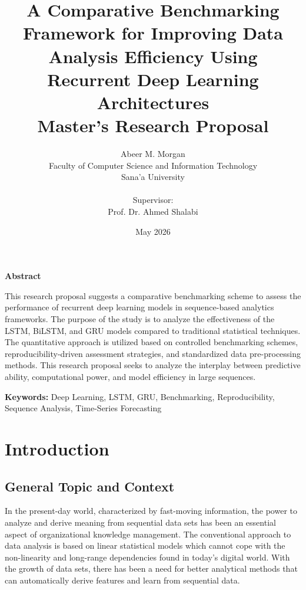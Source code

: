 \documentclass[12pt]{report}
\title{
\vspace{2cm}
\Huge\bfseries\color{primary}
A Comparative Benchmarking Framework for Improving Data Analysis Efficiency Using Recurrent Deep Learning Architectures
\\[1cm]
\Large\color{secondary}
Master's Research Proposal
}
\author{
\Large Abeer M. Morgan
\\[0.3cm]
\large Faculty of Computer Science and Information Technology
\\
Sana’a University
 \\
 \\
Supervisor:\\
Prof. Dr. Ahmed Shalabi
}
\date{\large May 2026}
\begin{document}
\maketitle



\vspace{1cm}

\begin{center}
{\Large\bfseries Abstract}
\end{center}

\vspace{0.5cm}

This research proposal suggests a comparative benchmarking scheme to assess the performance of recurrent deep learning models in sequence-based analytics frameworks. The purpose of the study is to analyze the effectiveness of the LSTM, BiLSTM, and GRU models compared to traditional statistical techniques. The quantitative approach is utilized based on controlled benchmarking schemes, reproducibility-driven assessment strategies, and standardized data pre-processing methods. This research proposal seeks to analyze the interplay between predictive ability, computational power, and model efficiency in large sequences.


\vspace{0.7cm}

\noindent
\textbf{Keywords:} Deep Learning, LSTM, GRU, Benchmarking, Reproducibility, Sequence Analysis, Time-Series Forecasting

\newpage

\tableofcontents
\newpage



\chapter{Introduction}

\section{General Topic and Context}

In the present-day world, characterized by fast-moving information, the power to analyze and derive meaning from sequential data sets has been an essential aspect of organizational knowledge management. The conventional approach to data analysis is based on linear statistical models which cannot cope with the non-linearity and long-range dependencies found in today’s digital world. With the growth of data sets, there has been a need for better analytical methods that can automatically derive features and learn from sequential data.
\end{document}
